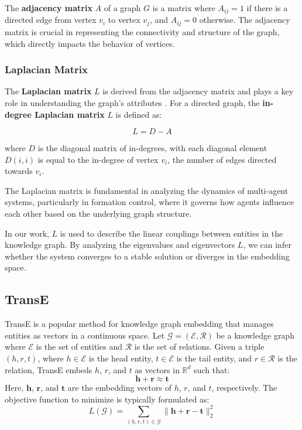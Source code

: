 \documentclass[letterpaper, 10 pt, conference]{ieeeconf}  %
\begin{document}
The \textbf{adjacency matrix} \( A \) of a graph \( G \) is a matrix where \( A_{ij} = 1 \) if there is a directed edge from vertex \( v_i \) to vertex \( v_j \), and \( A_{ij} = 0 \) otherwise. The adjacency matrix is crucial in representing the connectivity and structure of the graph, which directly impacts the behavior of vertices.

\subsubsection{Laplacian Matrix}

The \textbf{Laplacian matrix} \( L \) is derived from the adjacency matrix and plays a key role in understanding the graph's attributes \cite{mirzaev_laplacian_2013}. For a directed graph, the \textbf{in-degree Laplacian matrix} \( L \) is defined as:

\[
L = D - A
\]

\noindent where \( D \) is the diagonal matrix of in-degrees, with each diagonal element \( D(i, i) \) is equal to the in-degree of vertex \( v_i \), the number of edges directed towards \( v_i \).

\noindent The Laplacian matrix is fundamental in analyzing the dynamics of multi-agent systems, particularly in formation control, where it governs how agents influence each other based on the underlying graph structure.

In our work, $L$ is used to describe the linear couplings between entities in the knowledge graph. By analyzing the eigenvalues and eigenvectors $L$, we can infer whether the system converges to a stable solution or diverges in the embedding space.

\subsection{TransE}
TransE \cite{bordes_translating_2013} is a popular method for knowledge graph embedding that manages entities as vectors in a continuous space. Let $\mathcal{G} = (\mathcal{E}, \mathcal{R})$ be a knowledge graph where $\mathcal{E}$ is the set of entities and $\mathcal{R}$ is the set of relations. Given a triple $(h, r, t)$, where $h \in \mathcal{E}$ is the head entity, $t \in \mathcal{E}$ is the tail entity, and $r \in \mathcal{R}$ is the relation, TransE embeds $h$, $r$, and $t$ as vectors in $\mathbb{R}^d$ such that:
\[
\mathbf{h} + \mathbf{r} \approx \mathbf{t}
\]
Here, $\mathbf{h}$, $\mathbf{r}$, and $\mathbf{t}$ are the embedding vectors of $h$, $r$, and $t$, respectively. The objective function to minimize is typically formulated as:
\[
L(\mathcal{G}) = \sum_{(h,r,t) \in \mathcal{G}} \|\mathbf{h} + \mathbf{r} - \mathbf{t}\|_2^2
\]
\end{document}
